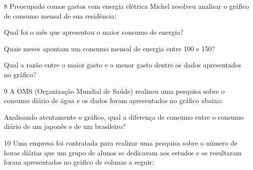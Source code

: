 

\num{8} Preocupado comos gastos com energia elétrica Michel resolveu
analisar o gráfico de consumo mensal de sua residência:


\begin{escolha}
\item
  Qual foi o mês que apresentou o maior consumo de energia?


\item
  Quais meses apontam um consumo mensal de energia entre 100 e 150?


\item
  Qual a razão entre o maior gasto e o menor gasto dentre os dados
  apresentados no gráfico?

\end{escolha}


\num{9} A OMS (Organização Mundial de Saúde) realizou uma pesquisa sobre o
consumo diário de água e os dados foram apresentados no gráfico abaixo:


Analisando atentamente o gráfico, qual a diferença de consumo entre o
consumo diário de um japonês e de um brasileiro?



\num{10} Uma empresa foi contratada para realizar uma pesquisa sobre o
número de horas diárias que um grupo de alunos se dedicavam aos estudos
e os resultaram foram apresentados no gráfico de colunas a seguir:

